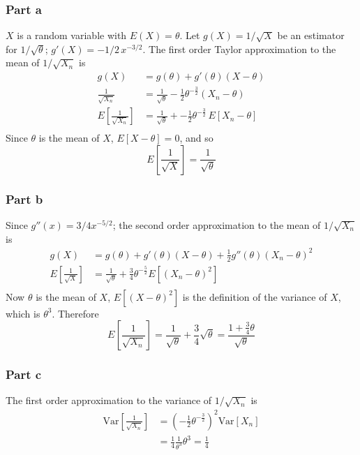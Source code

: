 \documentclass{article}
\begin{document}
\subsubsection*{Part a}
$X$ is a random variable with $E(X) = \theta$. Let $g(X) = 1/\sqrt{X}$ be an estimator for $1/\sqrt{\theta}$; $g'(X) = -1/2\,x^{-3/2}.$ The first order Taylor approximation to the mean of $1/\sqrt{X_n}$ is
\[\begin{aligned}
g(X) &= g(\theta)+g'(\theta)(X-\theta) \\
\frac{1}{\sqrt{X_n}} &= \frac{1}{\sqrt{\theta}} -\frac{1}{2}\theta^{-\frac{3}{2}}(X_n - \theta) \\
E\left[\frac{1}{\sqrt{X_n}}\right] &= \frac{1}{\sqrt{\theta}} + -\frac{1}{2}\theta^{-\frac{3}{2}}\,E\left[X_n - \theta\right] \\
\end{aligned}\]
Since $\theta$ is the mean of $X$, $E[X-\theta] = 0$, and so 
\[E\left[\frac{1}{\sqrt{X}}\right] = \frac{1}{\sqrt{\theta}}\]
\subsubsection*{Part b}
Since $g''(x) = 3/4x^{-5/2}$; the second order approximation to the mean of $1/\sqrt{X_n}$ is 
\[\begin{aligned}
g(X) &= g(\theta)+g'(\theta)(X-\theta)+\frac{1}{2}g''(\theta)(X_n-\theta)^2 \\
E\left[\frac{1}{\sqrt{X}}\right] &= \frac{1}{\sqrt{\theta}} + \frac{3}{4}\theta^{-\frac{5}{2}}E\left[(X_n - \theta)^2\right] \\
\end{aligned}\]
Now $\theta$ is the mean of $X$, $E\left[(X - \theta)^2\right]$ is the definition of the variance of $X$, which is $\theta^3$. Therefore
\[E\left[\frac{1}{\sqrt{X_n}}\right] = \frac{1}{\sqrt{\theta}} + \frac{3}{4}\sqrt{\theta}=\frac{1+\frac{3}{4}\theta}{\sqrt{\theta}}\] 
\subsubsection*{Part c}
The first order approximation to the variance of $1/\sqrt{X_n}$ is 
\[\begin{aligned}
\text{Var}\left[\frac{1}{\sqrt{X_n}}\right] &= \left(-\frac{1}{2}\theta^{-\frac{3}{2}}\right)^2\text{Var}\left[X_n\right] \\
&= \frac{1}{4}\frac{1}{\theta^3}\theta^3 = \frac{1}{4}
\end{aligned}\]
\end{document}

